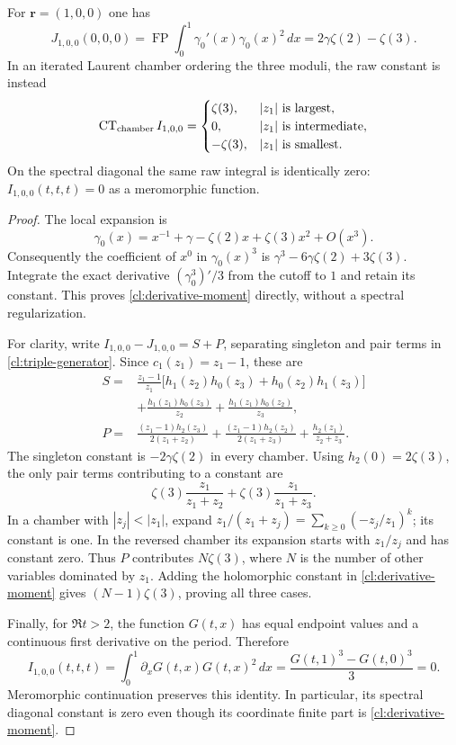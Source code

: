 \begin{proposition}
\label{cl:chambers}
For $\boldsymbol r=(1,0,0)$ one has
\begin{equation}\label{cl:derivative-moment}
 J_{1,0,0}(0,0,0)
 =\operatorname{FP}\int_0^1\gamma_0'(x)\gamma_0(x)^2\,dx
 =2\gamma\zeta(2)-\zeta(3).
\end{equation}
In an iterated Laurent
chamber ordering the three moduli, the raw constant is instead
\begin{equation}\label{cl:chamber-values}
 \operatorname{CT}_{\rm chamber}I_{1,0,0}
 =\begin{cases}
 \zeta(3),& |z_1|\text{ is largest},\\
 0,& |z_1|\text{ is intermediate},\\
 -\zeta(3),& |z_1|\text{ is smallest}.
 \end{cases}
\end{equation}
On the spectral diagonal the same raw integral is identically zero:
$I_{1,0,0}(t,t,t)=0$ as a meromorphic function.
\end{proposition}
\begin{proof}
The local expansion is
\[
 \gamma_0(x)=x^{-1}+\gamma-\zeta(2)x+\zeta(3)x^2+O(x^3).
\]
Consequently the coefficient of $x^0$ in $\gamma_0(x)^3$ is
$\gamma^3-6\gamma\zeta(2)+3\zeta(3)$. Integrate the exact derivative
$(\gamma_0^3)'/3$ from the cutoff to $1$ and retain its constant.
This proves \eqref{cl:derivative-moment} directly, without a spectral
regularization.

For clarity, write $I_{1,0,0}-J_{1,0,0}=S+P$, separating singleton
and pair terms in \eqref{cl:triple-generator}. Since $c_1(z_1)=z_1-1$,
these are
\begin{align*}
 S={}&\frac{z_1-1}{z_1}
       \bigl[h_1(z_2)h_0(z_3)+h_0(z_2)h_1(z_3)\bigr]\\
   &+\frac{h_1(z_1)h_0(z_3)}{z_2}
     +\frac{h_1(z_1)h_0(z_2)}{z_3},\\
 P={}&\frac{(z_1-1)h_2(z_3)}{2(z_1+z_2)}
     +\frac{(z_1-1)h_2(z_2)}{2(z_1+z_3)}
     +\frac{h_2(z_1)}{z_2+z_3}.
\end{align*}
The singleton constant is $-2\gamma\zeta(2)$ in every chamber.
Using $h_2(0)=2\zeta(3)$, the only pair terms contributing to a
constant are
\[
 \zeta(3)\frac{z_1}{z_1+z_2}
       +\zeta(3)\frac{z_1}{z_1+z_3}.
\]
In a chamber with $|z_j|<|z_1|$, expand
$z_1/(z_1+z_j)=\sum_{k\ge0}(-z_j/z_1)^k$; its constant is one.
In the reversed chamber its expansion starts with $z_1/z_j$ and
has constant zero. Thus $P$ contributes $N\zeta(3)$, where
$N$ is the number of other variables dominated by $z_1$.
Adding the holomorphic constant in \eqref{cl:derivative-moment} gives
$(N-1)\zeta(3)$, proving all three cases.

Finally, for $\Re t>2$, the function $G(t,x)$ has equal endpoint
values and a continuous first derivative on the period. Therefore
\[
 I_{1,0,0}(t,t,t)=\int_0^1
       \partial_xG(t,x)G(t,x)^2\,dx
       =\frac{G(t,1)^3-G(t,0)^3}{3}=0.
\]
Meromorphic continuation preserves this identity. In particular,
its spectral diagonal constant is zero even though its coordinate
finite part is \eqref{cl:derivative-moment}.
\end{proof}

